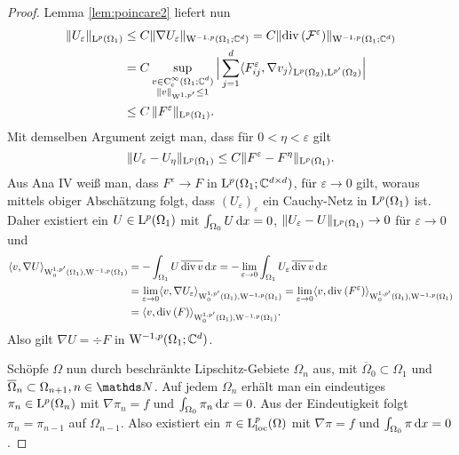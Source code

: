 \begin{proof}
  Lemma \ref{lem:poincare2} liefert nun
  \begin{align*}
  \| U_\varepsilon\|_{\mathrm{L}^p(\Omega_1)} 
  &\leq C \|\nabla U_\varepsilon\|_{\mathrm{W}^{-1,p}(\Omega_1; \mathbb{C}^d)} 
    = C \| \mathrm{div\,} (\mathcal{F}^\varepsilon)\|_{\mathrm{W}^{-1,p}(\Omega_1;\mathbb{C}^d)} \\
    &= C \sup_{\substack{v \in \mathrm{C}_{\mathrm{c}}^\infty(\Omega_1; \mathbb{C}^d) \\ \|v\|_{\mathrm{W}^{1,p'}} \leq 1}} \Big| \sum_{j = 1}^d \langle F_{ij}^\varepsilon, \nabla v_j \rangle_{\mathrm{L}^p(\Omega_2), \mathrm{L}^{p'}(\Omega_2)} \Big| \\
    &\leq C \, \|F^\varepsilon\|_{\mathrm{L}^p(\Omega_1)}.
  \end{align*}
  Mit demselben Argument zeigt man, dass für $0< \eta < \varepsilon$ gilt
  $$
  \|U_\varepsilon - U_\eta \|_{\mathrm{L}^p(\Omega_1)} \leq C \| F^\varepsilon - F^\eta\|_{\mathrm{L}^p(\Omega_1)}.
  $$
  Aus Ana IV weiß man, dass $F^\varepsilon \to F$ in $\mathrm{L}^p(\Omega_1; \mathbb{C}^{d\times d})$, für $\varepsilon \to 0$ gilt, woraus mittels obiger Abschätzung folgt, dass $(U_\varepsilon)_\varepsilon$ ein Cauchy-Netz in $\mathrm{L}^p(\Omega_1)$ ist.
  Daher existiert ein $U \in \mathrm{L}^p(\Omega_1)$ mit $\int_{\Omega_0} U \, {\operatorname{d}\!{x}} = 0$, $\|U_\varepsilon - U\|_{\mathrm{L}^p(\Omega_1)} \to 0$ für $\varepsilon \to 0$ und
  \begin{align*}
    \langle v, \nabla U \rangle_{\mathrm{W}_0^{1,p'}(\Omega_1), \mathrm{W}^{-1,p}(\Omega_1)}
    &= - \int_{\Omega_1} U \, \overline{\mathrm{div\,} v } \, {\operatorname{d}\!{x}}
    = - \lim_{\varepsilon \to 0} \int_{\Omega_1} U_\varepsilon \, \overline{\mathrm{div\,} v} \, {\operatorname{d}\!{x}} \\
    &= \lim_{\varepsilon \to 0} \langle v, \nabla U_\varepsilon \rangle_{\mathrm{W}_0^{1,p'}(\Omega_1), \mathrm{W}^{-1, p}(\Omega_1)}
    = \lim_{\varepsilon \to 0} \langle v, \mathrm{div\,} (F^\varepsilon) \rangle_{\mathrm{W}_0^{1,p'}(\Omega_1), \mathrm{W}^{-1, p}(\Omega_1)} \\
     &= \langle v, \mathrm{div\,} (F) \rangle_{\mathrm{W}_0^{1,p'}(\Omega_1), \mathrm{W}^{-1, p}(\Omega_1)}.
  \end{align*}
  Also gilt $\nabla U = \div F$ in $\mathrm{W}^{-1,p}(\Omega_1; \mathbb{C}^d)$.
  
  Schöpfe $\Omega$ nun durch beschränkte Lipschitz-Gebiete $\Omega_n$ aus, mit $\overline\Omega_0 \subset \Omega_1$ und $\overline\Omega_n \subset \Omega_{n + 1}, n \in \N$.
  Auf jedem $\Omega_n$ erhält man ein eindeutiges $\pi_n \in \mathrm{L}^p(\Omega_n)$ mit $\nabla \pi_n = f$ und $\int_{\Omega_0} \pi_n \, {\operatorname{d}\!{x}} = 0$.
  Aus der Eindeutigkeit folgt $\pi_n = \pi_{n -1}$ auf $\Omega_{n - 1}$.
  Also existiert ein $\pi \in \mathrm{L}^p_{\operatorname{loc}}(\Omega)$ mit $\nabla\pi = f$ und $\int_{\Omega_0} \pi \, {\operatorname{d}\!{x}} = 0$.
\end{proof}

